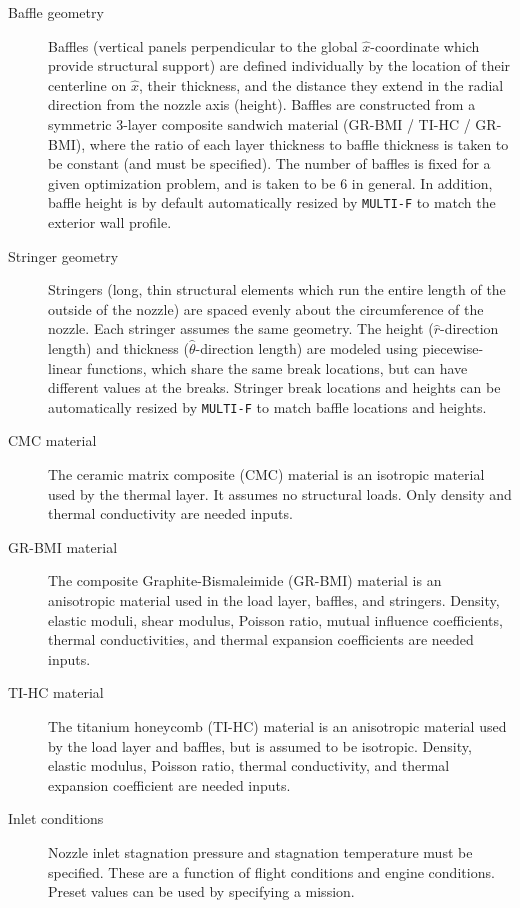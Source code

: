 \documentclass{article}
\begin{document}
\begin{description}
\item[Baffle geometry] Baffles (vertical panels perpendicular to the global $\hat{x}$-coordinate which provide structural support) are defined individually by the location of their centerline on $\hat{x}$, their thickness, and the distance they extend in the radial direction from the nozzle axis (height). Baffles are constructed from a symmetric 3-layer composite sandwich material (GR-BMI / TI-HC / GR-BMI), where the ratio of each layer thickness to baffle thickness is taken to be constant (and must be specified). The number of baffles is fixed for a given optimization problem, and is taken to be 6 in general. In addition, baffle height is by default automatically resized by \texttt{MULTI-F} to match the exterior wall profile.

\item[Stringer geometry] Stringers (long, thin structural elements which run the entire length of the outside of the nozzle) are spaced evenly about the circumference of the nozzle. Each stringer assumes the same geometry. The height ($\hat{r}$-direction length) and thickness ($\hat{\theta}$-direction length) are modeled using piecewise-linear functions, which share the same break locations, but can have different values at the breaks. Stringer break locations and heights can be automatically resized by \texttt{MULTI-F} to match baffle locations and heights.

\item[CMC material] The ceramic matrix composite (CMC) material is an isotropic material used by the thermal layer. It assumes no structural loads. Only density and thermal conductivity are needed inputs.

\item[GR-BMI material] The composite Graphite-Bismaleimide (GR-BMI) material is an anisotropic material used in the load layer, baffles, and stringers. Density, elastic moduli, shear modulus, Poisson ratio, mutual influence coefficients, thermal conductivities, and thermal expansion coefficients are needed inputs.

\item[TI-HC material] The titanium honeycomb (TI-HC) material is an anisotropic material used by the load layer and baffles, but is assumed to be isotropic. Density, elastic modulus, Poisson ratio, thermal conductivity, and thermal expansion coefficient are needed inputs.

\item[Inlet conditions] Nozzle inlet stagnation pressure and stagnation temperature must be specified. These are a function of flight conditions and engine conditions. Preset values can be used by specifying a mission.


\end{description}
\end{document}
